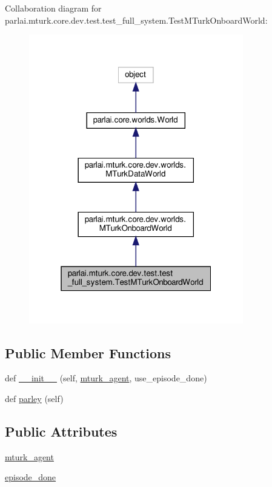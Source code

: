 Collaboration diagram for parlai.\+mturk.\+core.\+dev.\+test.\+test\+\_\+full\+\_\+system.\+Test\+M\+Turk\+Onboard\+World\+:
\nopagebreak
\begin{figure}[H]
\begin{center}
\leavevmode
\includegraphics[width=265pt]{dc/dc8/classparlai_1_1mturk_1_1core_1_1dev_1_1test_1_1test__full__system_1_1TestMTurkOnboardWorld__coll__graph}
\end{center}
\end{figure}
\subsection*{Public Member Functions}
\begin{DoxyCompactItemize}
\item 
def \hyperlink{classparlai_1_1mturk_1_1core_1_1dev_1_1test_1_1test__full__system_1_1TestMTurkOnboardWorld_a4488b20bd652972be39ed450e41cc5ff}{\+\_\+\+\_\+init\+\_\+\+\_\+} (self, \hyperlink{classparlai_1_1mturk_1_1core_1_1dev_1_1test_1_1test__full__system_1_1TestMTurkOnboardWorld_a57ab0490a71d0e7df3aeaf7d9d162dc9}{mturk\+\_\+agent}, use\+\_\+episode\+\_\+done)
\item 
def \hyperlink{classparlai_1_1mturk_1_1core_1_1dev_1_1test_1_1test__full__system_1_1TestMTurkOnboardWorld_a871930078d22c4519f130db54870d0f7}{parley} (self)
\end{DoxyCompactItemize}
\subsection*{Public Attributes}
\begin{DoxyCompactItemize}
\item 
\hyperlink{classparlai_1_1mturk_1_1core_1_1dev_1_1test_1_1test__full__system_1_1TestMTurkOnboardWorld_a57ab0490a71d0e7df3aeaf7d9d162dc9}{mturk\+\_\+agent}
\item 
\hyperlink{classparlai_1_1mturk_1_1core_1_1dev_1_1test_1_1test__full__system_1_1TestMTurkOnboardWorld_aef494264d564ac5e4f1170323bcc627b}{episode\+\_\+done}
\end{DoxyCompactItemize}


